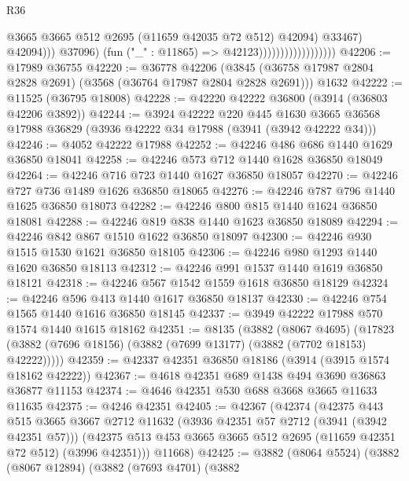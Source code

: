 \begin{lexlean}{R36}
\begin{coremodule}
                                                  @3665
                                                  @3665
                                                  @512
                                                  @2695
                                                  (@11659 @42035 @72 @512)
                                                  @42094)
                                                @33467)
                                              @42094)))
                                        @37096)
                                      (fun ("_" : @11865) => @42123))))))))))))))))))
@42206 := @17989 @36755
@42220 := @36778
    @42206
    (@3845 (@36758 @17987 @2804 @2828 @2691) (@3568 (@36764 @17987 @2804 @2828 @2691)))
    @1632
@42222 := @11525 (@36795 @18008)
@42228 := @42220 @42222 @36800 (@3914 (@36803 @42206 @3892))
@42244 := @3924
    @42222
    @220
    @445
    @1630
    @3665
    @36568
    @17988
    @36829
    (@3936 @42222 @34 @17988 (@3941 (@3942 @42222 @34)))
@42246 := @4052 @42222 @17988
@42252 := @42246 @486 @686 @1440 @1629 @36850 @18041
@42258 := @42246 @573 @712 @1440 @1628 @36850 @18049
@42264 := @42246 @716 @723 @1440 @1627 @36850 @18057
@42270 := @42246 @727 @736 @1489 @1626 @36850 @18065
@42276 := @42246 @787 @796 @1440 @1625 @36850 @18073
@42282 := @42246 @800 @815 @1440 @1624 @36850 @18081
@42288 := @42246 @819 @838 @1440 @1623 @36850 @18089
@42294 := @42246 @842 @867 @1510 @1622 @36850 @18097
@42300 := @42246 @930 @1515 @1530 @1621 @36850 @18105
@42306 := @42246 @980 @1293 @1440 @1620 @36850 @18113
@42312 := @42246 @991 @1537 @1440 @1619 @36850 @18121
@42318 := @42246 @567 @1542 @1559 @1618 @36850 @18129
@42324 := @42246 @596 @413 @1440 @1617 @36850 @18137
@42330 := @42246 @754 @1565 @1440 @1616 @36850 @18145
@42337 := @3949 @42222 @17988 @570 @1574 @1440 @1615 @18162
@42351 := @8135
    (@3882
      (@8067 @4695)
      (@17823 (@3882 (@7696 @18156) (@3882 (@7699 @13177) (@3882 (@7702 @18153) @42222)))))
@42359 := @42337 @42351 @36850 @18186 (@3914 (@3915 @1574 @18162 @42222))
@42367 := @4618 @42351 @689 @1438 @494 @3690 @36863 @36877 @11153
@42374 := @4646 @42351 @530 @688 @3668 @3665 @11633 @11635
@42375 := @4246 @42351
@42405 := @42367
    (@42374
      (@42375
        @443
        @515
        @3665
        @3667
        @2712
        @11632
        (@3936 @42351 @57 @2712 (@3941 (@3942 @42351 @57)))
        (@42375 @513 @453 @3665 @3665 @512 @2695 (@11659 @42351 @72 @512) (@3996 @42351)))
      @11668)
@42425 := @3882
    (@8064 @5524)
    (@3882
      (@8067 @12894)
      (@3882
        (@7693 @4701)
        (@3882

\end{coremodule}
\end{lexlean}
